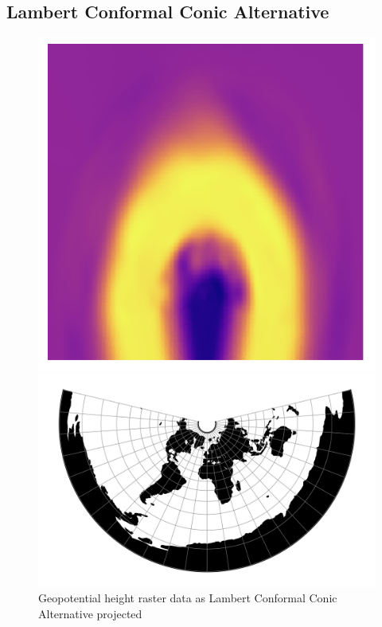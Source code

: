 \subsection{Lambert Conformal Conic Alternative}
\begin{figure}[h]
    \centering
    \begin{minipage}{0.30\textwidth}
        \centering
        \includegraphics[width=0.9\linewidth]{figures/chapter-8/geopoth_lcca.png}
        \caption{ Geopotential height raster data as Lambert Conformal Conic Alternative projected}
        \label{fig:lcca_geopoth_raster}
    \end{minipage}\hfill
    \begin{minipage}{0.30\textwidth}
        \centering
        \includegraphics[width=0.9\linewidth]{figures/chapter-8/lcca.png}

\end{minipage}
\end{figure}
